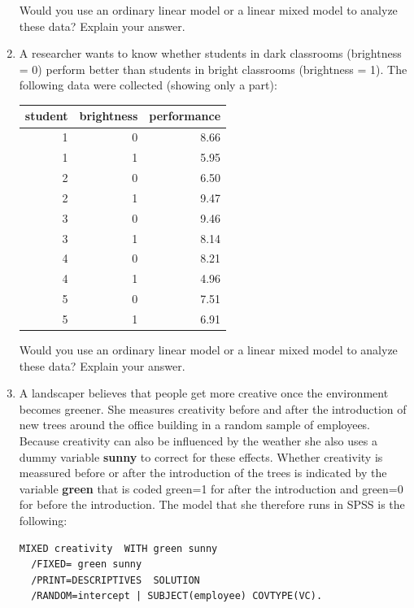 \documentclass[]{report}\usepackage[]{graphicx}\usepackage[]{color}
\newenvironment{knitrout}{}{} %
\begin{document}
\begin{enumerate}
\begin{knitrout}
\end{knitrout}

Would you use an ordinary linear model or a linear mixed model to analyze these data? Explain your answer.

\item  A researcher wants to know whether students in dark classrooms (brightness = 0) perform better than students in bright classrooms (brightness = 1). The following data were collected (showing only a part):


\begin{knitrout}
\color{fgcolor}
\begin{tabular}{r|r|r}
\hline
student & brightness & performance\\
\hline
1 & 0 & 8.66\\
\hline
1 & 1 & 5.95\\
\hline
2 & 0 & 6.50\\
\hline
2 & 1 & 9.47\\
\hline
3 & 0 & 9.46\\
\hline
3 & 1 & 8.14\\
\hline
4 & 0 & 8.21\\
\hline
4 & 1 & 4.96\\
\hline
5 & 0 & 7.51\\
\hline
5 & 1 & 6.91\\
\hline
\end{tabular}


\end{knitrout}

Would you use an ordinary linear model or a linear mixed model to analyze these data? Explain your answer.



\item 
A landscaper believes that people get more creative once the environment becomes greener. She measures creativity before and after the introduction of new trees around the office building in a random sample of employees. Because creativity can also be influenced by the weather she also uses a dummy variable \textbf{sunny} to correct for these effects. Whether creativity is meassured before or after the introduction of the trees is indicated by the variable \textbf{green} that is coded green=1 for after the introduction and green=0 for before the introduction. The model that she therefore runs in SPSS is the following:

\begin{verbatim}
MIXED creativity  WITH green sunny
  /FIXED= green sunny
  /PRINT=DESCRIPTIVES  SOLUTION
  /RANDOM=intercept | SUBJECT(employee) COVTYPE(VC).
\end{verbatim}


\end{enumerate}
\end{document}

